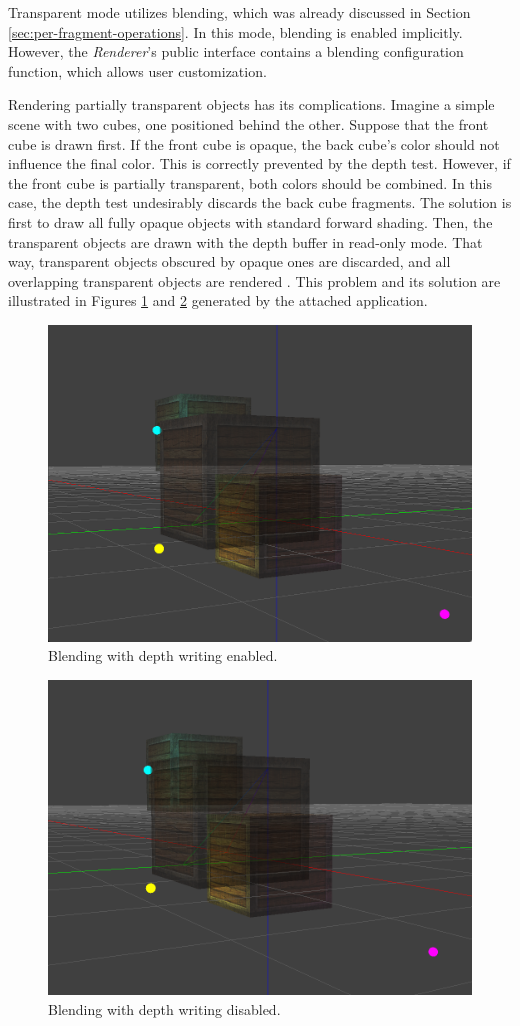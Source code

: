 \documentclass[
  digital,     %
  oneside,     %
  nosansbold,  %
  nocolorbold, %
  lof,         %
  lot,         %
]{fithesis4}
\begin{document}
Transparent mode utilizes blending, which was already discussed in Section \ref{sec:per-fragment-operations}.
In this mode, blending is enabled implicitly. However, the \textit{Renderer}'s public interface contains
a blending configuration function, which allows user customization.

Rendering partially transparent objects has its complications. Imagine a simple scene
with two cubes, one positioned behind the other. Suppose
that the front cube is drawn first. If the front cube is opaque, the back cube's
color should not influence the final color. This is correctly prevented by the depth test.
However, if the front cube is partially transparent, both colors should be combined.
In this case, the depth test undesirably discards the back cube fragments.
The solution is first to draw all fully opaque objects with standard forward shading.
Then, the transparent objects are drawn with the depth buffer in read-only mode.
That way, transparent objects obscured by opaque ones are discarded, and all overlapping
transparent objects are rendered \cite[p.263]{opengl-book}. This problem and its solution
are illustrated in Figures \ref{fig:incorrect-alpha} and \ref{fig:correct-alpha} generated by the
attached application.
\begin{figure}[H]
    \centering
    \includegraphics[width=.6\textwidth]{images/incorrect-alpha.png}
    \caption{Blending with depth writing enabled.}
    \label{fig:incorrect-alpha}
\end{figure}
\begin{figure}[H]
    \centering
    \includegraphics[width=.6\textwidth]{images/correct-alpha.png}
    \caption{Blending with depth writing disabled.}
    \label{fig:correct-alpha}
\end{figure}
\end{document}
